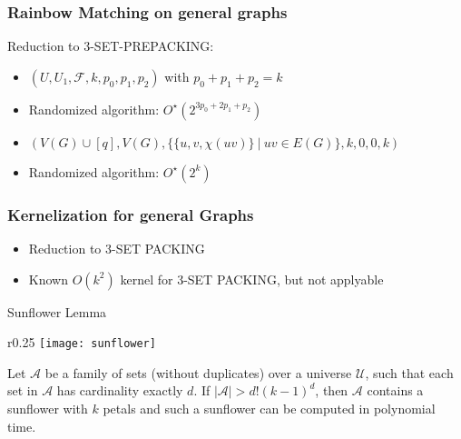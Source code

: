 \documentclass{beamer}
\begin{document}
\begin{frame}
    \frametitle{Rainbow Matching on general graphs}
    
    Reduction to 3-SET-PREPACKING:

    \begin{itemize}
        \pause
        \item $(U, U_1, \mathcal{F}, k, p_0, p_1, p_2)$ with $p_0 + p_1 + p_2 = k$
        \pause
        \item Randomized algorithm: $O^{\star}(2^{3p_0 + 2p_1 + p_2})$
        \pause
        \item $(V(G) \cup [q], V(G), \{\{u, v, \chi(uv)\} ~|~ uv \in E(G)\}, k, 0, 0, k)$
        \pause
        \item Randomized algorithm: $O^{\star}(2^k)$
    \end{itemize}
\end{frame}

\begin{frame}
    \frametitle{Kernelization for general Graphs}
    \begin{itemize}
        \pause
        \item Reduction to 3-SET PACKING
        \pause
        \item Known $O(k^2)$ kernel for 3-SET PACKING, but not applyable
    \end{itemize}
    
    \pause
    \begin{block}{Sunflower Lemma}
        \begin{wrapfigure}{r}{0.25\textwidth}
            \centering
            \texttt{[image: sunflower]}
        \end{wrapfigure}
        Let $\mathcal{A}$ be a family of sets (without duplicates) over a universe $\mathcal{U}$, such that each set in $\mathcal{A}$ has cardinality exactly $d$.
        If $|\mathcal{A}| > d!(k - 1)^d$, then $\mathcal{A}$ contains a sunflower with $k$ petals and such a sunflower can be computed in polynomial time.
    \end{block}
\end{frame}
\end{document}
